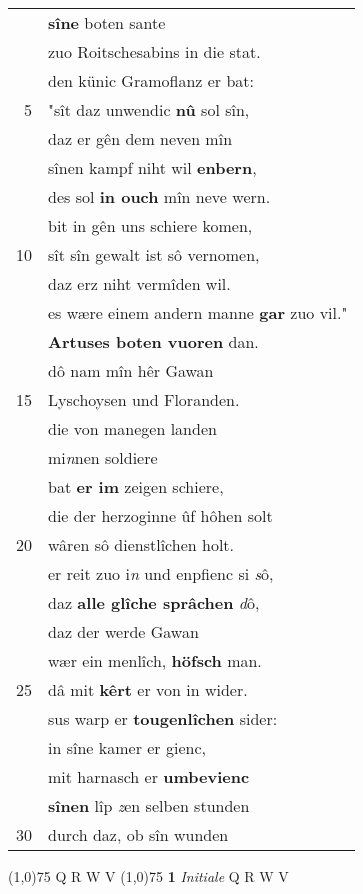 \documentclass[8pt,a4paper,notitlepage]{article}
\begin{document}
\begin{table}[ht]
\begin{minipage}[t]{0.5\linewidth}
\begin{tabular}{rl}
 & \textbf{sîne} boten sante\\ 
 & zuo Roitschesabins in die stat.\\ 
 & den künic Gramoflanz er bat:\\ 
5 & "sît daz unwendic \textbf{nû} sol sîn,\\ 
 & daz er gên dem neven mîn\\ 
 & sînen kampf niht wil \textbf{enbern},\\ 
 & des sol \textbf{in ouch} mîn neve wern.\\ 
 & bit in gên uns schiere komen,\\ 
10 & sît sîn gewalt ist sô vernomen,\\ 
 & daz erz niht vermîden wil.\\ 
 & es wære einem andern manne \textbf{gar} zuo vil."\\ 
 & \textbf{Artuses boten vuoren} dan.\\ 
 & dô nam mîn hêr Gawan\\ 
15 & Lyschoysen und Floranden.\\ 
 & die von manegen landen\\ 
 & mi\textit{n}nen soldiere\\ 
 & bat \textbf{er im} zeigen schiere,\\ 
 & die der herzoginne ûf hôhen solt\\ 
20 & wâren sô dienstlîchen holt.\\ 
 & er reit zuo i\textit{n} und enpfienc si \textit{s}ô,\\ 
 & daz \textbf{alle glîche sprâchen} \textit{d}ô,\\ 
 & daz der werde Gawan\\ 
 & wær ein menlîch, \textbf{höfsch} man.\\ 
25 & dâ mit \textbf{kêrt} er von in wider.\\ 
 & sus warp er \textbf{tougenlîchen} sider:\\ 
 & in sîne kamer er gienc,\\ 
 & mit harnasch er \textbf{umbevienc}\\ 
 & \textbf{sînen} lîp \textit{z}en selben stunden\\ 
30 & durch daz, ob sîn wunden\\ 
\end{tabular}
\scriptsize
\line(1,0){75} \newline
Q R W V \newline
\line(1,0){75} \newline
\textbf{1} \textit{Initiale} Q R W V  \newline

\end{minipage}
\end{table}
\end{document}
